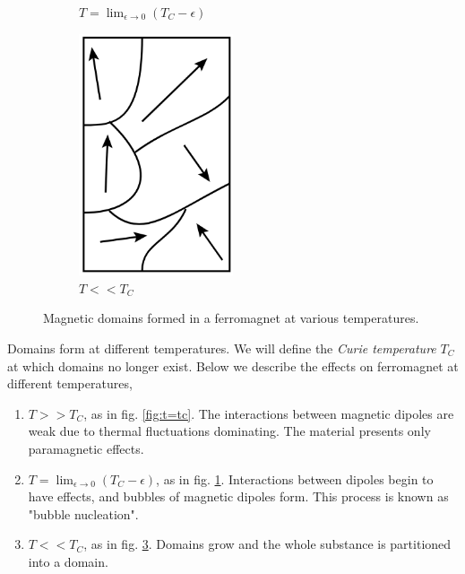 \documentclass{book}
\begin{document}
\begin{figure}
\begin{subfigure}{0.3\textwidth}
		\caption{$T = \lim_{\epsilon \to 0} (T_C - \epsilon)$}
		\label{fig:t - e}
	\end{subfigure}
	\begin{subfigure}{0.3\textwidth}
		\centering
		\includegraphics[width=0.5\textwidth]{T__T_C.png}
		\caption{$T << T_C$}
		\label{fig: t < tc}
	\end{subfigure}
	\caption{Magnetic domains formed in a ferromagnet at various temperatures.}
\end{figure}
Domains form at different temperatures. We will define the \textit{Curie temperature} $T_C$ at which domains no longer exist. Below we describe the effects on ferromagnet at different temperatures,
\begin{enumerate}
	\item $T >> T_C$, as in fig. \ref{fig:t=tc}. The interactions between magnetic dipoles are weak due to thermal fluctuations dominating. The material presents only paramagnetic effects.
	\item $T = \lim_{\epsilon \to 0}(T_C - \epsilon)$, as in fig. \ref{fig:t - e}. Interactions between dipoles begin to have effects, and bubbles of magnetic dipoles form. This process is known as "bubble nucleation".
	\item $T << T_C$, as in fig. \ref{fig: t < tc}. Domains grow and the whole substance is partitioned into a domain.
\end{enumerate}
\end{document}
